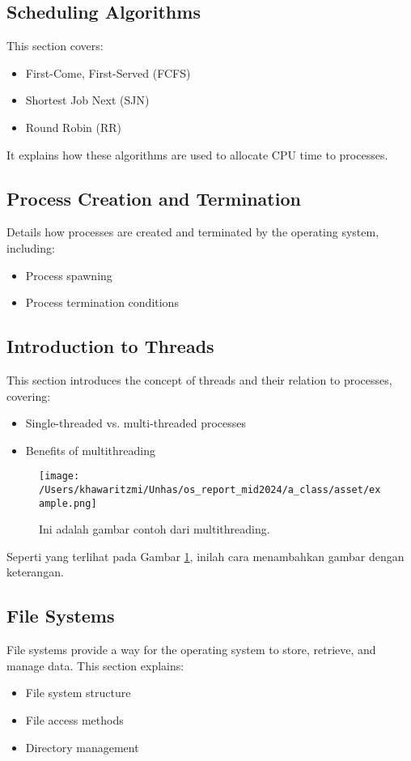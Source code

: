 \documentclass[12pt]{article}
\begin{document}
\begin{enumerate}
\subsection{Scheduling Algorithms}
This section covers:
\begin{itemize}
    \item First-Come, First-Served (FCFS)
    \item Shortest Job Next (SJN)
    \item Round Robin (RR)
\end{itemize}
It explains how these algorithms are used to allocate CPU time to processes.

\subsection{Process Creation and Termination}
Details how processes are created and terminated by the operating system, including:
\begin{itemize}
    \item Process spawning
    \item Process termination conditions
\end{itemize}

\subsection{Introduction to Threads}
This section introduces the concept of threads and their relation to processes, covering:
\begin{itemize}
    \item Single-threaded vs. multi-threaded processes
    \item Benefits of multithreading
\end{itemize}

\begin{figure}[h]
    \centering
    \texttt{[image: /Users/khawaritzmi/Unhas/os\_report\_mid2024/a\_class/asset/example.png]}  %
    \caption{Ini adalah gambar contoh dari multithreading.}
    \label{fig:contoh_gambar}
\end{figure}

Seperti yang terlihat pada Gambar \ref{fig:contoh_gambar}, inilah cara menambahkan gambar dengan keterangan.

\subsection{File Systems}
File systems provide a way for the operating system to store, retrieve, and manage data. This section explains:
\begin{itemize}
    \item File system structure
    \item File access methods
    \item Directory management
\end{itemize}


\end{enumerate}
\end{document}
